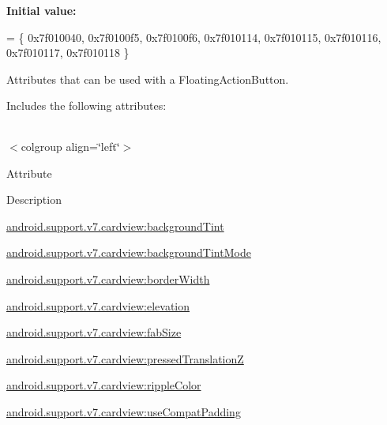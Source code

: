 {\bfseries Initial value\+:}
\begin{DoxyCode}
= \{
            0x7f010040, 0x7f0100f5, 0x7f0100f6, 0x7f010114,
            0x7f010115, 0x7f010116, 0x7f010117, 0x7f010118
        \}
\end{DoxyCode}
Attributes that can be used with a Floating\+Action\+Button. 

Includes the following attributes\+:

\tabulinesep=1mm
\begin{longtabu} spread 0pt [c]{*{0}{|X[-1]}|}
\hline
\end{longtabu}
$<$colgroup align=\char`\"{}left\char`\"{}$>$ 

Attribute

Description 

{\ttfamily \hyperlink{classandroid_1_1support_1_1v7_1_1cardview_1_1R_1_1styleable_ac96a17d99f0790bb52924789602d440b}{android.\+support.\+v7.\+cardview\+:background\+Tint}}

{\ttfamily \hyperlink{classandroid_1_1support_1_1v7_1_1cardview_1_1R_1_1styleable_a7823af4317af3e74f9d2ed0b009312aa}{android.\+support.\+v7.\+cardview\+:background\+Tint\+Mode}}

{\ttfamily \hyperlink{classandroid_1_1support_1_1v7_1_1cardview_1_1R_1_1styleable_a6ade0c9a91640786d052b5ce9007367a}{android.\+support.\+v7.\+cardview\+:border\+Width}}

{\ttfamily \hyperlink{classandroid_1_1support_1_1v7_1_1cardview_1_1R_1_1styleable_a477d324687e0fa87caccb4664d67dbc8}{android.\+support.\+v7.\+cardview\+:elevation}}

{\ttfamily \hyperlink{classandroid_1_1support_1_1v7_1_1cardview_1_1R_1_1styleable_affce83fe036d64bf069fab004a29b09a}{android.\+support.\+v7.\+cardview\+:fab\+Size}}

{\ttfamily \hyperlink{classandroid_1_1support_1_1v7_1_1cardview_1_1R_1_1styleable_a8529a0b7a3336b9f9172273795f573f5}{android.\+support.\+v7.\+cardview\+:pressed\+TranslationZ}}

{\ttfamily \hyperlink{classandroid_1_1support_1_1v7_1_1cardview_1_1R_1_1styleable_aba4e7e7c1ea8caf0dd310ef0ad576337}{android.\+support.\+v7.\+cardview\+:ripple\+Color}}

{\ttfamily \hyperlink{classandroid_1_1support_1_1v7_1_1cardview_1_1R_1_1styleable_a8651097694af5cd9a96507bdc22abdcb}{android.\+support.\+v7.\+cardview\+:use\+Compat\+Padding}}

